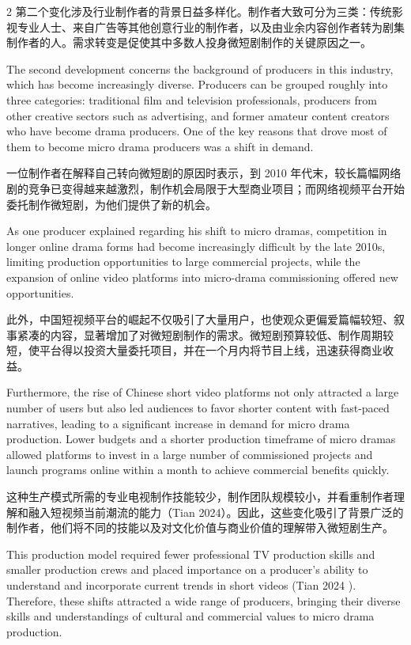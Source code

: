 \documentclass[10pt,a4paper]{article}
\begin{document}
\begin{paracol}{2}
\switchcolumn*
第二个变化涉及行业制作者的背景日益多样化。制作者大致可分为三类：传统影视专业人士、来自广告等其他创意行业的制作者，以及由业余内容创作者转为剧集制作者的人。需求转变是促使其中多数人投身微短剧制作的关键原因之一。\par
\switchcolumn
The second development concerns the background of producers in this industry, which has become increasingly diverse. Producers can be grouped roughly into three categories: traditional film and television professionals, producers from other creative sectors such as advertising, and former amateur content creators who have become drama producers. One of the key reasons that drove most of them to become micro drama producers was a shift in demand.\par
\switchcolumn*
一位制作者在解释自己转向微短剧的原因时表示，到 2010 年代末，较长篇幅网络剧的竞争已变得越来越激烈，制作机会局限于大型商业项目；而网络视频平台开始委托制作微短剧，为他们提供了新的机会。\par
\switchcolumn
As one producer explained regarding his shift to micro dramas, competition in longer online drama forms had become increasingly difficult by the late 2010s, limiting production opportunities to large commercial projects, while the expansion of online video platforms into micro-drama commissioning offered new opportunities.\par
\switchcolumn*
此外，中国短视频平台的崛起不仅吸引了大量用户，也使观众更偏爱篇幅较短、叙事紧凑的内容，显著增加了对微短剧制作的需求。微短剧预算较低、制作周期较短，使平台得以投资大量委托项目，并在一个月内将节目上线，迅速获得商业收益。\par
\switchcolumn
Furthermore, the rise of Chinese short video platforms not only attracted a large number of users but also led audiences to favor shorter content with fast-paced narratives, leading to a significant increase in demand for micro drama production. Lower budgets and a shorter production timeframe of micro dramas allowed platforms to invest in a large number of commissioned projects and launch programs online within a month to achieve commercial benefits quickly.\par
\switchcolumn*
这种生产模式所需的专业电视制作技能较少，制作团队规模较小，并看重制作者理解和融入短视频当前潮流的能力（Tian 2024）。因此，这些变化吸引了背景广泛的制作者，他们将不同的技能以及对文化价值与商业价值的理解带入微短剧生产。\par
\switchcolumn
This production model required fewer professional TV production skills and smaller production crews and placed importance on a producer’s ability to understand and incorporate current trends in short videos (Tian 2024 ). Therefore, these shifts attracted a wide range of producers, bringing their diverse skills and understandings of cultural and commercial values to micro drama production.\par

\end{paracol}
\end{document}
